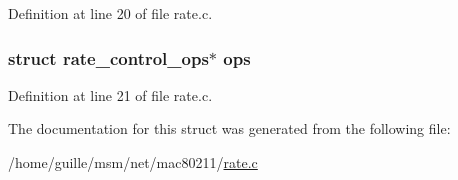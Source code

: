Definition at line 20 of file rate.\-c.

\hypertarget{structrate__control__alg_ab4edfb3119eea89ac8b10fb2b542f6f8}{
\subsubsection[{ops}]{\setlength{\rightskip}{0pt plus 5cm}struct rate\-\_\-control\-\_\-ops$\ast$ ops}}\label{structrate__control__alg_ab4edfb3119eea89ac8b10fb2b542f6f8}


Definition at line 21 of file rate.\-c.



The documentation for this struct was generated from the following file\-:\begin{DoxyCompactItemize}
\item 
/home/guille/msm/net/mac80211/\hyperlink{rate_8c}{rate.\-c}\end{DoxyCompactItemize}
